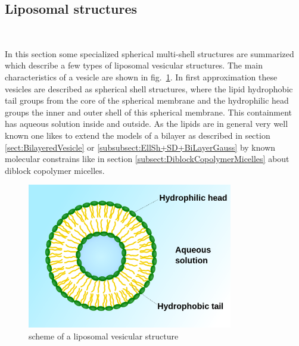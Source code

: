 \clearpage

\subsection{Liposomal structures} ~\\
\label{plugin:vesicle}

In this section some specialized spherical multi-shell structures are summarized which describe a few types of liposomal vesicular structures. The main characteristics of a vesicle are shown in fig.\ \ref{fig:liposomal_vesicular_structure}. In first approximation these vesicles are described as spherical shell structures, where the lipid hydrophobic tail groups from the core of the spherical membrane and the hydrophilic head groups the inner and outer shell of this spherical membrane. This containment has aqueous solution inside and outside. As the lipids are in general very well known one likes to extend the models of a bilayer as described in section \ref{sect:BilayeredVesicle} or \ref{subsubsect:EllSh+SD+BiLayerGauss} by known  molecular constrains like in section \ref{subsect:DiblockCopolymerMicelles} about diblock copolymer micelles.

\begin{figure}[htb]
\begin{center}
\includegraphics[width=0.8\textwidth]{../images/form_factor/vesicles/Liposome_scheme-en.png}
\end{center}
\caption{scheme of a liposomal vesicular structure}
\label{fig:liposomal_vesicular_structure}
\end{figure}

